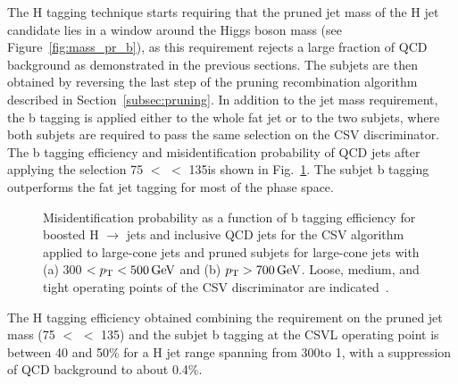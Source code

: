 The H tagging technique starts requiring that the pruned jet mass of the H jet candidate lies in a window around the Higgs boson mass (see Figure~\ref{fig:mass_pr_b}),
as this requirement rejects a large fraction of QCD background as demonstrated in the previous sections.
The subjets are then obtained by reversing the last step of the pruning recombination algorithm described in Section~\ref{subsec:pruning}.
In addition to the jet mass requirement, the b tagging is applied either to the whole fat jet or to the two subjets, where both subjets are required
to pass the same selection on the CSV discriminator. The b tagging efficiency and misidentification probability of QCD jets after applying the selection 75 $<$ \mJ $<$ 135\GeV is shown in Fig.~\ref{fig:htagging8TeV}.
The subjet b tagging outperforms the fat jet tagging for most of the phase space.

\begin{figure}[!htb]
\centering     %
{}
 \caption{Misidentification probability as a function of b tagging efficiency for boosted H $\to$ \bbbar jets and inclusive QCD jets for the CSV algorithm applied to large-cone jets
 and pruned subjets for large-cone jets with (a) 300 $< p_{\mathrm{T}} < 500\,\text{Ge\hspace{-.08em}V}$ and (b) $p_{\mathrm{T}} > 700\,\text{Ge\hspace{-.08em}V}$. Loose, medium, and tight operating points of the CSV discriminator are indicated~\cite{CMS:BTV13001}.}
\label{fig:htagging8TeV}
\end{figure}

The H tagging efficiency obtained combining the requirement on the pruned jet mass (75 $<$ \mJ $<$ 135\GeV)
and the subjet b tagging at the CSVL operating point is between 40 and 50\% for a H jet \pt range spanning from 300\GeV to 1\TeV,
with a suppression of QCD background to about 0.4\%.\\

